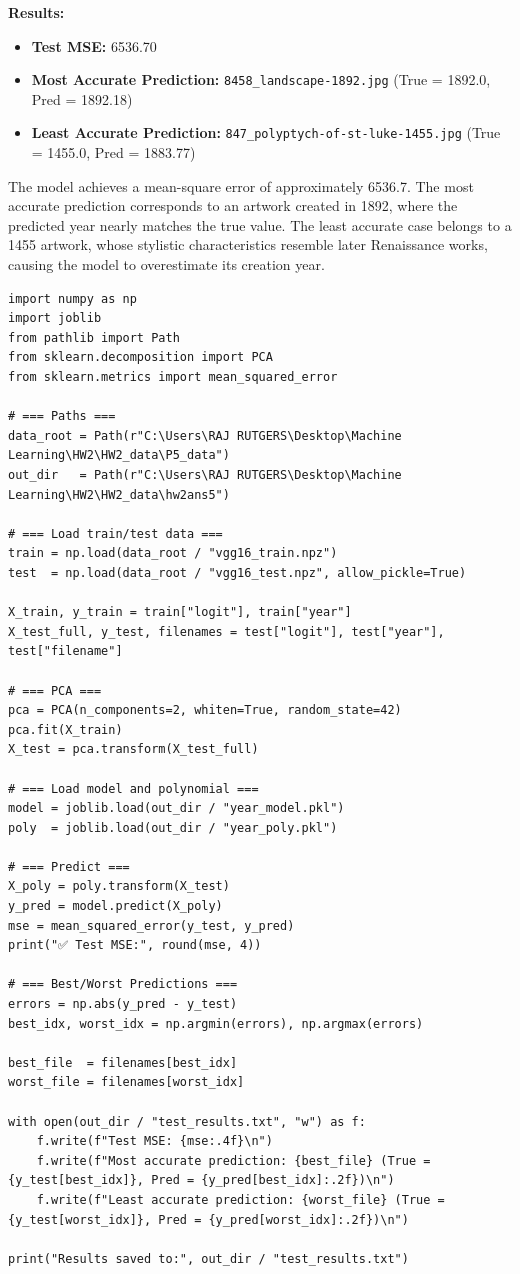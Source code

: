 \documentclass[12pt]{article}
\begin{document}
\noindent\textbf{Results:}
\begin{itemize}
    \item \textbf{Test MSE:} 6536.70
    \item \textbf{Most Accurate Prediction:} \texttt{8458\_landscape-1892.jpg} (True = 1892.0, Pred = 1892.18)
    \item \textbf{Least Accurate Prediction:} \texttt{847\_polyptych-of-st-luke-1455.jpg} (True = 1455.0, Pred = 1883.77)
\end{itemize}

The model achieves a mean-square error of approximately 6536.7. The most accurate prediction
corresponds to an artwork created in 1892, where the predicted year nearly matches the true value.
The least accurate case belongs to a 1455 artwork, whose stylistic characteristics resemble
later Renaissance works, causing the model to overestimate its creation year.

\begin{lstlisting}[style=pythonstyle, caption={year\_test.py – Model Evaluation on Test Set}]
import numpy as np
import joblib
from pathlib import Path
from sklearn.decomposition import PCA
from sklearn.metrics import mean_squared_error

# === Paths ===
data_root = Path(r"C:\Users\RAJ RUTGERS\Desktop\Machine Learning\HW2\HW2_data\P5_data")
out_dir   = Path(r"C:\Users\RAJ RUTGERS\Desktop\Machine Learning\HW2\HW2_data\hw2ans5")

# === Load train/test data ===
train = np.load(data_root / "vgg16_train.npz")
test  = np.load(data_root / "vgg16_test.npz", allow_pickle=True)

X_train, y_train = train["logit"], train["year"]
X_test_full, y_test, filenames = test["logit"], test["year"], test["filename"]

# === PCA ===
pca = PCA(n_components=2, whiten=True, random_state=42)
pca.fit(X_train)
X_test = pca.transform(X_test_full)

# === Load model and polynomial ===
model = joblib.load(out_dir / "year_model.pkl")
poly  = joblib.load(out_dir / "year_poly.pkl")

# === Predict ===
X_poly = poly.transform(X_test)
y_pred = model.predict(X_poly)
mse = mean_squared_error(y_test, y_pred)
print("✅ Test MSE:", round(mse, 4))

# === Best/Worst Predictions ===
errors = np.abs(y_pred - y_test)
best_idx, worst_idx = np.argmin(errors), np.argmax(errors)

best_file  = filenames[best_idx]
worst_file = filenames[worst_idx]

with open(out_dir / "test_results.txt", "w") as f:
    f.write(f"Test MSE: {mse:.4f}\n")
    f.write(f"Most accurate prediction: {best_file} (True = {y_test[best_idx]}, Pred = {y_pred[best_idx]:.2f})\n")
    f.write(f"Least accurate prediction: {worst_file} (True = {y_test[worst_idx]}, Pred = {y_pred[worst_idx]:.2f})\n")

print("Results saved to:", out_dir / "test_results.txt")

\end{lstlisting}
\end{document}
